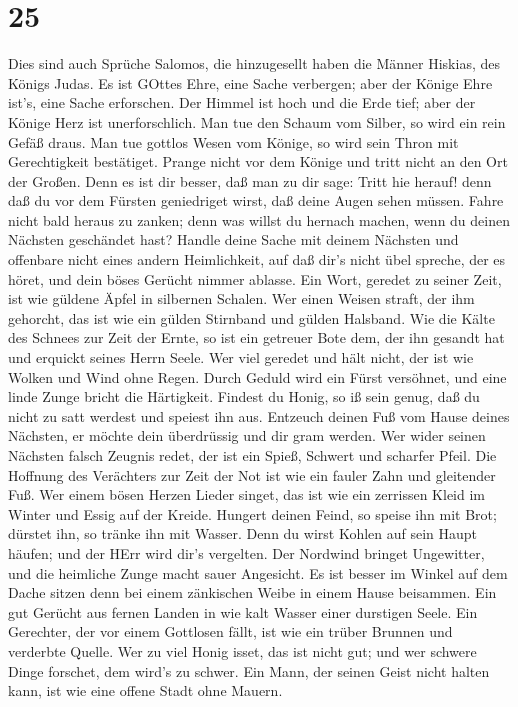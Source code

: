 \hypertarget{section-24}{%
\section{25}\label{section-24}}

 Dies sind auch Sprüche Salomos, die hinzugesellt haben die
Männer Hiskias, des Königs Judas.  Es ist GOttes Ehre, eine
Sache verbergen; aber der Könige Ehre ist's, eine Sache erforschen.
 Der Himmel ist hoch und die Erde tief; aber der Könige Herz
ist unerforschlich.  Man tue den Schaum vom Silber, so wird
ein rein Gefäß draus.  Man tue gottlos Wesen vom Könige, so
wird sein Thron mit Gerechtigkeit bestätiget.  Prange nicht
vor dem Könige und tritt nicht an den Ort der Großen.  Denn
es ist dir besser, daß man zu dir sage: Tritt hie herauf! denn daß du
vor dem Fürsten geniedriget wirst, daß deine Augen sehen müssen.
 Fahre nicht bald heraus zu zanken; denn was willst du
hernach machen, wenn du deinen Nächsten geschändet hast? 
Handle deine Sache mit deinem Nächsten und offenbare nicht eines andern
Heimlichkeit,  auf daß dir's nicht übel spreche, der es
höret, und dein böses Gerücht nimmer ablasse.  Ein Wort,
geredet zu seiner Zeit, ist wie güldene Äpfel in silbernen Schalen.
 Wer einen Weisen straft, der ihm gehorcht, das ist wie ein
gülden Stirnband und gülden Halsband.  Wie die Kälte des
Schnees zur Zeit der Ernte, so ist ein getreuer Bote dem, der ihn
gesandt hat und erquickt seines Herrn Seele.  Wer viel
geredet und hält nicht, der ist wie Wolken und Wind ohne Regen.
 Durch Geduld wird ein Fürst versöhnet, und eine linde
Zunge bricht die Härtigkeit.  Findest du Honig, so iß sein
genug, daß du nicht zu satt werdest und speiest ihn aus. 
Entzeuch deinen Fuß vom Hause deines Nächsten, er möchte dein
überdrüssig und dir gram werden.  Wer wider seinen Nächsten
falsch Zeugnis redet, der ist ein Spieß, Schwert und scharfer Pfeil.
 Die Hoffnung des Verächters zur Zeit der Not ist wie ein
fauler Zahn und gleitender Fuß.  Wer einem bösen Herzen
Lieder singet, das ist wie ein zerrissen Kleid im Winter und Essig auf
der Kreide.  Hungert deinen Feind, so speise ihn mit Brot;
dürstet ihn, so tränke ihn mit Wasser.  Denn du wirst
Kohlen auf sein Haupt häufen; und der HErr wird dir's vergelten.
 Der Nordwind bringet Ungewitter, und die heimliche Zunge
macht sauer Angesicht.  Es ist besser im Winkel auf dem
Dache sitzen denn bei einem zänkischen Weibe in einem Hause beisammen.
 Ein gut Gerücht aus fernen Landen in wie kalt Wasser einer
durstigen Seele.  Ein Gerechter, der vor einem Gottlosen
fällt, ist wie ein trüber Brunnen und verderbte Quelle. 
Wer zu viel Honig isset, das ist nicht gut; und wer schwere Dinge
forschet, dem wird's zu schwer.  Ein Mann, der seinen Geist
nicht halten kann, ist wie eine offene Stadt ohne Mauern.

